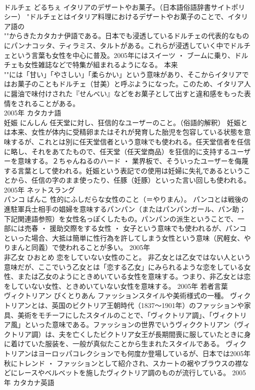 \documentclass[8pt]{extreport}
\begin{document}
\begin{CJK}{UTF8}{min}
\\	ドルチェ	どるちぇ	イタリアのデザートやお菓子。（日本語俗語辞書サイトポリシー）	"ドルチェとはイタリア料理におけるデザートやお菓子のことで、イタリア語の
\\	""からきたカタカナ伊語である。日本でも浸透しているドルチェの代表的なものにパンナコッタ、ティラミス、タルトがある。これらが浸透していく中でドルチェという言葉も女性を中心に普及。2005年にはスイーツ ・ ブームに乗り、ドルチェも女性雑誌などで特集が組まれるようになる。 本来
\\	""には「甘い」「やさしい」「柔らかい」という意味があり、そこからイタリアではお菓子のこともドルチェ（甘美）と呼ぶようになった。このため、イタリア人に醤油で味付けされた『せんべい』などをお菓子として出すと違和感をもった表情をされることがある。
\\	2005年	カタカナ語	
\\	妊娠	にんしん	任天堂に対し、狂信的なユーザーのこと。（俗語的解釈）	妊娠とは本来、女性が体内に受精卵またはそれが発育した胎児を包容している状態を意味するが、これとは別に任天堂信者という意味でも使われる。任天堂信者を任信に略し、それをあてたもので、任天堂（任天堂商品）を狂信的に支持するユーザーを意味する。２ちゃんねるのハード ・ 業界板で、そういったユーザーを侮蔑する言葉として使われる。妊娠という表記での使用は妊婦に失礼であるということから、任信の字のまま使ったり、任豚（妊豚）といった言い回しも使われる。	2005年	ネットスラング	
\\	パンコ	ぱんこ	性的にふしだらな女性のこと（＝やりまん）。	パンコとは戦後の進駐軍兵士相手の娼婦を意味するパンパン（またはパンパンガール、パン助；下記関連語参照）を女性名っぽくしたもの。パンパンの派生ということで、一部には売春 ・ 援助交際をする女性 ・ 女子という意味でも使われるが、パンコといった場合、大抵は簡単に性行為を許してしまう女性という意味（尻軽女、やりまんと同義）で使われることが多い。	2005年	
\\	非乙女	ひおとめ	恋をしていない女性のこと。	非乙女とは乙女ではない人という意味だが、ここでいう乙女とは「恋する乙女」にみられるような恋をしている女性、または乙女のようにときめいている女性を意味する。つまり、非乙女とは恋をしていない女性、ときめいていない女性を意味する。	2005年	若者言葉	
\\	ヴィクトリアン	びくとりあん	ファッションスタイルや美術様式の一種。	ヴィクトリアンとは、英国のビクトリア王朝時代（1837～1901年）のファッションや家具、美術をモチーフにしたスタイルのことで、「ヴィクトリア調」、「ヴィクトリア風」といった意味である。ファッションの世界でいうヴィククトリアン（ヴィクトリア調）は、夫を亡くしたビクトリア女王が長期間喪に服していたときに身に着けていた服装を、一般が真似たことから生まれたスタイルである。 ヴィクトリアンはヨーロッパコレクションでも何度か登場しているが、日本では2005年秋にトレンド ・ ファッションとして紹介され、スカートの裾やブラウスの襟などにレースやベルベットを施したヴィクトリア調のものが流行している。	2005年	カタカナ英語	

\end{CJK}
\end{document}
